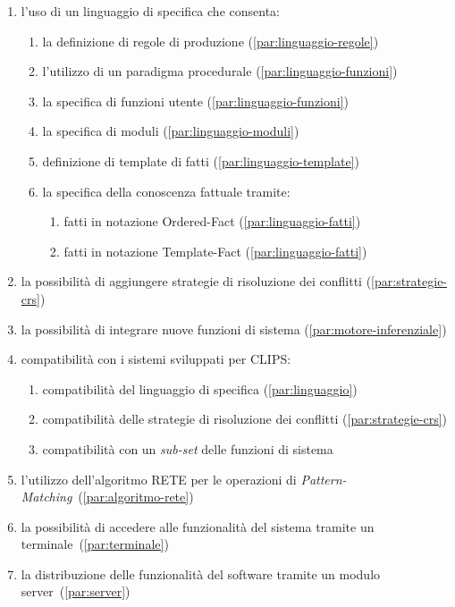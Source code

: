 \begin{enumerate}
	\item l'uso di un linguaggio di specifica che consenta:
		\begin{enumerate}
			\item la definizione di regole di produzione (\ref{par:linguaggio-regole})
			\item l'utilizzo di un paradigma procedurale (\ref{par:linguaggio-funzioni})
			\item la specifica di funzioni utente (\ref{par:linguaggio-funzioni})
			\item la specifica di moduli (\ref{par:linguaggio-moduli})
			\item definizione di template di fatti (\ref{par:linguaggio-template})
			\item la specifica della conoscenza fattuale tramite:
				\begin{enumerate}
					\item fatti in notazione Ordered-Fact (\ref{par:linguaggio-fatti})
					\item fatti in notazione Template-Fact (\ref{par:linguaggio-fatti})
				\end{enumerate}
		\end{enumerate}
	\item la possibilità di aggiungere strategie di risoluzione dei conflitti (\ref{par:strategie-crs})
	\item la possibilità di integrare nuove funzioni di sistema (\ref{par:motore-inferenziale})
	\item compatibilità con i sistemi sviluppati per CLIPS:
		\begin{enumerate}
			\item compatibilità del linguaggio di specifica (\ref{par:linguaggio})
			\item compatibilità delle strategie di risoluzione dei conflitti (\ref{par:strategie-crs})
			\item compatibilità con un \emph{sub-set} delle funzioni di sistema
		\end{enumerate}
	\item l'utilizzo dell'algoritmo RETE per le operazioni di \emph{Pattern-Matching}~(\ref{par:algoritmo-rete})
	\item la possibilità di accedere alle funzionalità del sistema tramite un terminale~(\ref{par:terminale})
	\item la distribuzione delle funzionalità del software tramite un modulo server~(\ref{par:server})
\end{enumerate}


